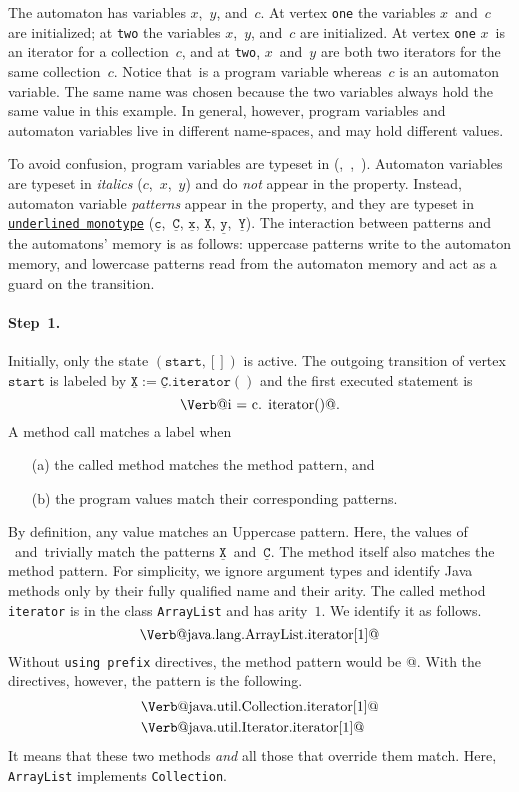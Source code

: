 \documentclass{sigplanconf}[10pt] %
\makeatletter
\newcommand{\pattern}[1]{\ensuremath{\mathtt{\underline{#1}}}}
\newcommand{\start}{\ensuremath{\mathtt{start}}\xspace}
\newcommand{\verbline}[2][]{\[\text{\Verb@#2@}#1\]}
\makeatother
\begin{document}
The automaton has variables $x$,~$y$, and~$c$.
At vertex \texttt{one} the variables $x$~and~$c$ are initialized;
at \texttt{two} the variables $x$,~$y$, and~$c$ are initialized.
At vertex \texttt{one} $x$~is an iterator for a collection~$c$, and
at \texttt{two}, $x$~and~$y$ are both two iterators for the same collection~$c$.
Notice that~\Verb@c@ is a program variable whereas~$c$ is an automaton variable.
The same name was chosen because the two variables always hold the same value in this example.
In general, however, program variables and automaton variables live in different name-spaces, and may hold different values.

To avoid confusion, program variables are typeset in \Verb@monotype@ (\Verb@c@,~\Verb@i@,~\Verb@j@).
Automaton variables are typeset in \textit{italics} ($c$,~$x$,~$y$) and do \emph{not} appear in the property.
Instead, automaton variable \emph{patterns} appear in the property, and they are typeset in \texttt{\underline{underlined monotype}} (\pattern c,~\pattern C, \pattern x, \pattern X, \pattern y,~\pattern Y).
The interaction between patterns and the automatons' memory is as follows: uppercase patterns write to the automaton memory, and lowercase patterns read from the automaton memory and act as a guard on the transition.

\paragraph{Step~1.}

Initially, only the state $(\start,[])$ is active.
The outgoing transition of vertex \start is labeled by $\pattern X:=\pattern{C}.\mathtt{iterator}()$ and the first executed statement is \verbline[.]{i = c.\PY{n+na}{iterator}()}
A method call matches a label when
\begin{itemize}
\item[(a)] the called method matches the method pattern, and
\item[(b)] the program values match their corresponding patterns.
\end{itemize}
By definition, any value matches an Uppercase pattern.
Here, the values of \Verb@i@~and~\Verb@c@ trivially match the patterns \pattern X~and~\pattern C.
The method itself also matches the method pattern.
For simplicity, we ignore argument types and identify Java methods only by their fully qualified name and their arity.
The called method \texttt{iterator} is in the class \texttt{ArrayList} and has arity~$1$.
We identify it as follows.
\verbline{java.lang.ArrayList.iterator[1]}
Without \texttt{using prefix} directives, the method pattern would be \Verb@iterator[1]@.
With the directives, however, the pattern is the following.
\begin{align*}
&\text{\Verb@java.util.Collection.iterator[1]@} \\
&\text{\Verb@java.util.Iterator.iterator[1]@}
\end{align*}
It means that these two methods \emph{and} all those that override them match.
Here, \texttt{ArrayList} implements \texttt{Collection}.
\end{document}
